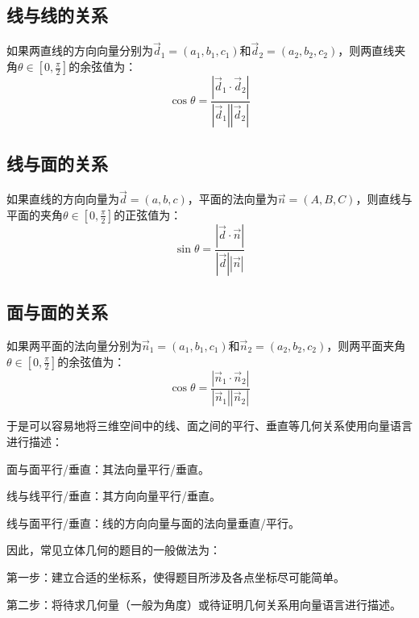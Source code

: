 \subsection{线与线的关系}
如果两直线的方向向量分别为\(\vec{d}_{1} = \left( a_{1} , b_{1} , c_{1} \right)\)和\(\vec{d}_{2} = \left( a_{2} , b_{2} , c_{2} \right)\)，则两直线夹角\(\theta \in [0 , \frac{\pi}{2}]\)的余弦值为：
\begin{equation}
    \cos \theta = \frac{\left| \vec{d}_{1} \cdot \vec{d}_{2} \right|}{\left| \vec{d}_{1} \right| \left| \vec{d}_{2} \right|}
\end{equation}

\subsection{线与面的关系}
如果直线的方向向量为\(\vec{d} = \left( a , b , c \right)\)，平面的法向量为\(\vec{n} = \left( A , B , C \right)\)，则直线与平面的夹角\(\theta \in [0 , \frac{\pi}{2}]\)的正弦值为：
\begin{equation}
    \sin \theta = \frac{\left| \vec{d} \cdot \vec{n} \right|}{\left| \vec{d} \right| \left| \vec{n} \right|}
\end{equation}

\subsection{面与面的关系}
如果两平面的法向量分别为\(\vec{n}_{1} = \left( a_{1} , b_{1} , c_{1} \right)\)和\(\vec{n}_{2} = \left( a_{2} , b_{2} , c_{2} \right)\)，则两平面夹角\(\theta \in [0 , \frac{\pi}{2}]\)的余弦值为：
\begin{equation}
    \cos \theta = \frac{\left| \vec{n}_{1} \cdot \vec{n}_{2} \right|}{\left| \vec{n}_{1} \right| \left| \vec{n}_{2} \right|}
\end{equation}

于是可以容易地将三维空间中的线、面之间的平行、垂直等几何关系使用向量语言进行描述：

面与面平行/垂直：其法向量平行/垂直。

线与线平行/垂直：其方向向量平行/垂直。

线与面平行/垂直：线的方向向量与面的法向量垂直/平行。

因此，常见立体几何的题目的一般做法为：

第一步：建立合适的坐标系，使得题目所涉及各点坐标尽可能简单。

第二步：将待求几何量（一般为角度）或待证明几何关系用向量语言进行描述。

